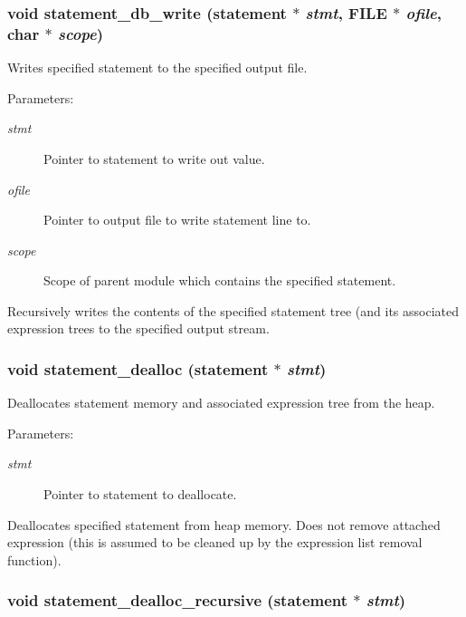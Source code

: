\subsubsection{\setlength{\rightskip}{0pt plus 5cm}void statement\_\-db\_\-write ({\bf statement} $\ast$ {\em stmt}, FILE $\ast$ {\em ofile}, char $\ast$ {\em scope})}\label{statement_8h_a1}


Writes specified statement to the specified output file. 

\begin{Desc}
\item[Parameters:]
\begin{description}
\item[{\em stmt}]Pointer to statement to write out value. \item[{\em ofile}]Pointer to output file to write statement line to. \item[{\em scope}]Scope of parent module which contains the specified statement.\end{description}
\end{Desc}
Recursively writes the contents of the specified statement tree (and its associated expression trees to the specified output stream. 
\subsubsection{\setlength{\rightskip}{0pt plus 5cm}void statement\_\-dealloc ({\bf statement} $\ast$ {\em stmt})}\label{statement_8h_a6}


Deallocates statement memory and associated expression tree from the heap. 

\begin{Desc}
\item[Parameters:]
\begin{description}
\item[{\em stmt}]Pointer to statement to deallocate.\end{description}
\end{Desc}
Deallocates specified statement from heap memory. Does not remove attached expression (this is assumed to be cleaned up by the expression list removal function). 
\subsubsection{\setlength{\rightskip}{0pt plus 5cm}void statement\_\-dealloc\_\-recursive ({\bf statement} $\ast$ {\em stmt})}\label{statement_8h_a5}


